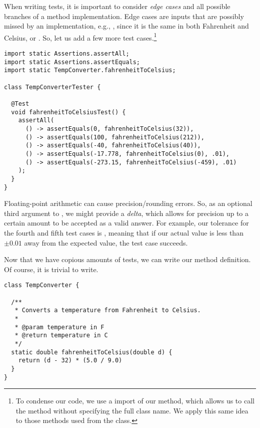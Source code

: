 When writing tests, it is important to consider \textit{edge cases} and all possible branches of a method implementation. Edge cases are inputs that are possibly missed by an implementation, e.g., , since it is the same in both Fahrenheit and Celsius, or . So, let us add a few more test cases.\footnote{To condense our code, we use a  import of our  method, which allows us to call the method without specifying the full class name. We apply this same idea to those methods used from the  class.}

\begin{cl}{}
\begin{lstlisting}[language=MyJava]
import static Assertions.assertAll;
import static Assertions.assertEquals;
import static TempConverter.fahrenheitToCelsius;

class TempConverterTester {

  @Test
  void fahrenheitToCelsiusTest() {
    assertAll(
      () -> assertEquals(0, fahrenheitToCelsius(32)),
      () -> assertEquals(100, fahrenheitToCelsius(212)),
      () -> assertEquals(-40, fahrenheitToCelsius(40)),
      () -> assertEquals(-17.778, fahrenheitToCelsius(0), .01),
      () -> assertEquals(-273.15, fahrenheitToCelsius(-459), .01)
    );
  }
}
\end{lstlisting}
\end{cl}

Floating-point arithmetic can cause precision/rounding errors. So, as an optional third argument to , we might provide a \textit{delta}, which allows for precision up to a certain amount to be accepted as a valid answer. For example, our tolerance for the fourth and fifth test cases is , meaning that if our actual value is less than $\pm 0.01$ away from the expected value, the test case succeeds.

Now that we have copious amounts of tests, we can write our method definition. Of course, it is trivial to write.

\begin{cl}{}
\begin{lstlisting}[language=MyJava]
class TempConverter {

  /**
   * Converts a temperature from Fahrenheit to Celsius.
   * 
   * @param temperature in F
   * @return temperature in C
   */
  static double fahrenheitToCelsius(double d) {
    return (d - 32) * (5.0 / 9.0)
  }
}
\end{lstlisting}
\end{cl}

